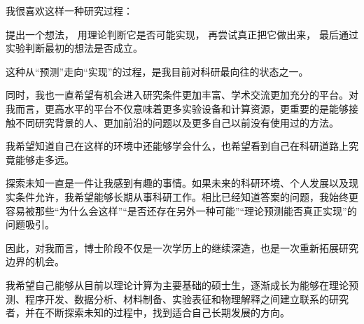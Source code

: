 我很喜欢这样一种研究过程：

提出一个想法， 用理论判断它是否可能实现， 再尝试真正把它做出来， 最后通过实验判断最初的想法是否成立。

这种从“预测”走向“实现”的过程，是我目前对科研最向往的状态之一。

同时，我也一直希望有机会进入研究条件更加丰富、学术交流更加充分的平台。对我而言，更高水平的平台不仅意味着更多实验设备和计算资源，更重要的是能够接触不同研究背景的人、更加前沿的问题以及更多自己以前没有使用过的方法。

我希望知道自己在这样的环境中还能够学会什么，也希望看到自己在科研道路上究竟能够走多远。

探索未知一直是一件让我感到有趣的事情。如果未来的科研环境、个人发展以及现实条件允许，我希望能够长期从事科研工作。相比已经知道答案的问题，我始终更容易被那些“为什么会这样”“是否还存在另外一种可能”“理论预测能否真正实现”的问题吸引。

因此，对我而言，博士阶段不仅是一次学历上的继续深造，也是一次重新拓展研究边界的机会。

我希望自己能够从目前以理论计算为主要基础的硕士生，逐渐成长为能够在理论预测、程序开发、数据分析、材料制备、实验表征和物理解释之间建立联系的研究者，并在不断探索未知的过程中，找到适合自己长期发展的方向。
